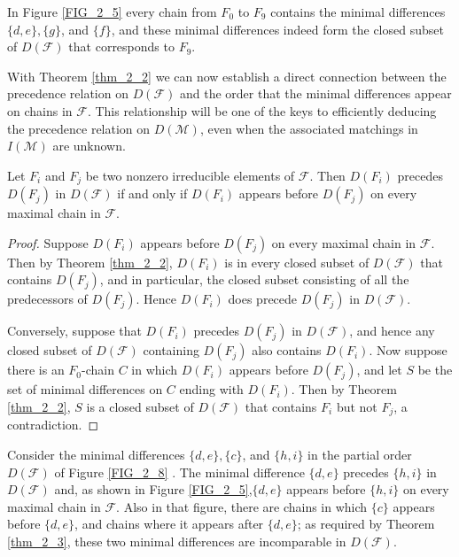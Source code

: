 \begin{exmp}\label{exmp_2_10}
In Figure \ref{FIG_2_5} every chain from $F_0$ to $F_9$ contains the minimal differences $\{d, e\},\{g\}$, and $\{f\}$, and these minimal differences indeed form the closed subset of $D(\mathcal{F})$ that corresponds to $F_9$.
\end{exmp}

With Theorem \ref{thm_2_2} we can now establish a direct connection between the precedence relation on $D(\mathcal{F})$ and the order that the minimal differences appear on chains in $\mathcal{F}$. This relationship will be one of the keys to efficiently deducing the precedence relation on $D(\mathcal{M})$, even when the associated matchings in $I(\mathcal{M})$ are unknown.

\begin{theorem}\label{thm_2_3}
    Let $F_i$ and $F_j$ be two nonzero irreducible elements of $\mathcal{F}$. Then $D\left(F_i\right)$ precedes $D\left(F_j\right)$ in $D(\mathcal{F})$ if and only if $D\left(F_i\right)$ appears before $D\left(F_j\right)$ on every maximal chain in $\mathcal{F}$.
\end{theorem}

\begin{proof}
    Suppose $D\left(F_i\right)$ appears before $D\left(F_j\right)$ on every maximal chain in $\mathcal{F}$. Then by Theorem \ref{thm_2_2}, $D\left(F_i\right)$ is in every closed subset of $D(\mathcal{F})$ that contains $D\left(F_j\right)$, and in particular, the closed subset consisting of all the predecessors of $D\left(F_j\right)$. Hence $D\left(F_i\right)$ does precede $D\left(F_j\right)$ in $D(\mathcal{F})$.

    Conversely, suppose that $D\left(F_i\right)$ precedes $D\left(F_j\right)$ in $D(\mathcal{F})$, and hence any closed subset of $D(\mathcal{F})$ containing $D\left(F_j\right)$ also contains $D\left(F_i\right)$. Now suppose there is an $F_0$-chain $C$ in which $D\left(F_i\right)$ appears before $D\left(F_j\right)$, and let $S$ be the set of minimal differences on $C$ ending with $D\left(F_i\right)$. Then by Theorem \ref{thm_2_2}, $S$ is a closed subset of $D(\mathcal{F})$ that contains $F_i$ but not $F_j$, a contradiction.
\end{proof}

\begin{exmp}\label{exmp_2_11}
    Consider the minimal differences $\{d, e\},\{c\}$, and $\{h, i\}$ in the partial order $D(\mathcal{F})$ of Figure \ref{FIG_2_8} . The minimal difference $\{d, e\}$ precedes $\{h, i\}$ in $D(\mathcal{F})$ and, as shown in Figure \ref{FIG_2_5},$\{d, e\}$ appears before $\{h, i\}$ on every maximal chain in $\mathcal{F}$. Also in that figure, there are chains in which $\{c\}$ appears before $\{d, e\}$, and chains where it appears after $\{d, e\}$; as required by Theorem \ref{thm_2_3}, these two minimal differences are incomparable in $D(\mathcal{F})$.
\end{exmp}

